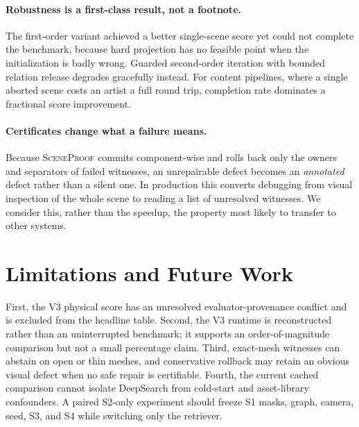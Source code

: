\documentclass[10pt,twocolumn]{article}
\newcommand{\proofsys}{\textsc{SceneProof}}
\begin{document}
\paragraph{Robustness is a first-class result, not a footnote.}
The first-order variant achieved a better single-scene score yet could not
complete the benchmark, because hard projection has no feasible point when the
initialization is badly wrong.  Guarded second-order iteration with bounded
relation release degrades gracefully instead.  For content pipelines, where a
single aborted scene costs an artist a full round trip, completion rate
dominates a fractional score improvement.

\paragraph{Certificates change what a failure means.}
Because \proofsys{} commits component-wise and rolls back only the owners and
separators of failed witnesses, an unrepairable defect becomes an
\emph{annotated} defect rather than a silent one.  In production this converts
debugging from visual inspection of the whole scene to reading a list of
unresolved witnesses.  We consider this, rather than the speedup, the property
most likely to transfer to other systems.

\section{Limitations and Future Work}

First, the V3 physical score has an unresolved evaluator-provenance conflict
and is excluded from the headline table.  Second, the V3 runtime is reconstructed
rather than an uninterrupted benchmark; it supports an order-of-magnitude
comparison but not a small percentage claim.  Third, exact-mesh witnesses can
abstain on open or thin meshes, and conservative rollback may retain an obvious
visual defect when no safe repair is certifiable.  Fourth, the current cached
comparison cannot isolate DeepSearch from cold-start and asset-library
confounders.  A paired S2-only experiment should freeze S1 masks, graph,
camera, seed, S3, and S4 while switching only the retriever.
\end{document}
